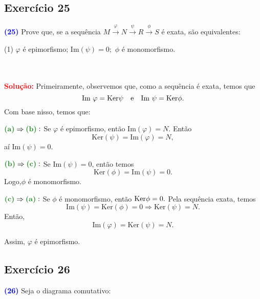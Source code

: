 \documentclass[11pt,a4paper]{article}
\newcommand{\exercicio}[1]{\subsection{Exercício #1} \textcolor{blue}{\bf(#1)}}
\newcommand{\dividiritens}[1]{\begin{tasks}[counter-format={(tsk[a])},label-width=3.6ex, label-format = {\bfseries}, column-sep = {0pt}](1) #1 \end{tasks}}
\newcommand{\pers}[1]{\textcolor{Floresta}{$\negrito{(#1)} $}}
\newcommand{\solucao}[1]{
\textbf{\textcolor{white}{oi}\\ \\ \textcolor{red}{Solução:}} #1}
\begin{document}
\exercicio{25} Prove que, se a sequência $M \xrightarrow{\varphi} N \xrightarrow{\psi} R \xrightarrow{\phi} S$ é exata, são equivalentes:
\dividiritens{
\task[\pers{a}] $\varphi$ é epimorfismo;
\task[\pers{b}] $\mbox{Im}(\psi) = 0;$
\task[\pers{c}] $\phi$ é monomorfismo.
}
\solucao{
Primeiramente, observemos que, como a sequência é exata, temos que
\[
\mbox{Im } \varphi = {\rm Ker} \psi \quad \mbox{e} \quad \mbox{Im } \psi = {\rm Ker} \phi.
\]
Com base nisso, temos que:

$\textbf{\textcolor{Floresta}{(a)}} \Rightarrow \textbf{\textcolor{Floresta}{(b)}}:$ Se $\varphi$ é epimorfismo, então $\mbox{Im}(\varphi)=N.$ Então \[\mbox{Ker}(\psi)=\mbox{Im}(\varphi)=N,\] aí $\mbox{Im}(\psi)=0$. 

\medskip
\noindent
$\textbf{\textcolor{Floresta}{(b)}} \Rightarrow \textbf{\textcolor{Floresta}{(c)}}:$
Se $\mbox{Im}(\psi)=0$, então temos \[\mbox{Ker}(\phi)=\mbox{Im}(\psi)=0.\]
Logo,$\phi$ é monomorfismo.

\medskip
\noindent
$\textbf{\textcolor{Floresta}{(c)}} \Rightarrow \textbf{\textcolor{Floresta}{(a)}}:$ Se $\phi$ é monomorfismo, então ${\rm Ker} \phi = 0.$ Pela sequência exata, temos
\[\mbox{Im}(\psi)=\mbox{Ker}(\phi)=0 \Rightarrow \mbox{Ker}(\psi)=N.\]
Então, \[\mbox{Im}(\varphi)=\mbox{Ker}(\psi)=N.\] 

Assim, $\varphi$ é epimorfismo.
}
\exercicio{26} Seja o diagrama comutativo:
\begin{center}
\end{center}
\end{document}
